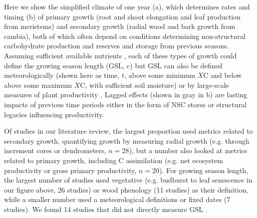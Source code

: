 \documentclass[11pt]{article}
\newcommand{\R}[1]{\label{#1}\linelabel{#1}}
\begin{document}
Here we show the simplified climate of one year (a), which determines rates and timing (b) of primary growth (root and shoot elongation and leaf production from meristems) and secondary growth (radial wood and bark growth from cambia), both of which often depend on conditions determining non-structural carbohydrate \citep[NSC, which are sugars and starch needed for growth and an important area of study, for more details see][]{hartmann2016understanding,martinez2016dynamics,tixier2020comparison,luo2024internal} production and reserves and storage from previous seasons. \R{forbigKNUTS1}Assuming sufficient available nutrients \citep{korner2015paradigm}, each of these types of growth could define the growing season length (GSL, c) but GSL can also be defined meteorologically (shown here as time, $t$, above some minimum $X$\degree C and below above some maximum $X$\degree C, with sufficient soil moisture) or by large-scale measures of plant productivity \citep{korner2023four}. Lagged effects (shown in gray in b) are lasting impacts of previous time periods either in the form of NSC stores or structural legacies influencing productivity. 

Of studies in our literature review, the largest proportion used metrics related to secondary growth, quantifying growth by measuring radial growth (e.g. through increment cores or dendrometers, $n=$28), but a number also looked at metrics related to primary growth, including C assimilation (e.g. net ecosystem productivity or gross primary productivity, $n=$20). For growing season length, the largest number of studies used vegetative (e.g. budburst to leaf senescence in our figure above, 26 studies) or wood phenology (11 studies) as their definition, while a smaller number used a meteorological definitions or fixed dates (7 studies). We found 14 studies that did not directly measure GSL \citep[e.g.][]{zhu2021different,dow2022warm,zohner2023effect}. 
\end{document}
